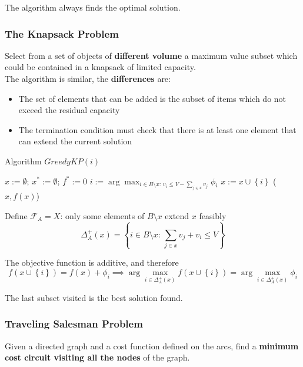 The algorithm always finds the optimal solution.\\

\newpage

\subsubsection{The Knapsack Problem} 
Select from a set of objects of \textbf{different volume} a maximum value subset which could be contained in a knapsack of limited capacity.\\

The algorithm is similar, the \textbf{differences} are:
\begin{itemize}
	\item The set of elements that can be added is the subset of items which do not exceed the residual capacity
	
	\item The termination condition must check that there is at least one element that can extend the current solution
\end{itemize}

\begin{algorithm}
	\caption{Algorithm $GreedyKP(i)$}
	\begin{algorithmic}
		\STATE $x := \emptyset$; $x^\ast := \emptyset$; $f^\ast := 0$
		\STATE $i := \arg \max_{i \in B \setminus x : \, v_i \leq V - \sum_{j \in x} v_j} \phi_i$
		\STATE $x := x \cup \left\{i\right\}$
		\ENDWHILE
		\RETURN ($x, f(x)$)
	\end{algorithmic}
\end{algorithm}

Define $\mathcal{F}_A = X$: only some elements of $B \setminus x$ extend $x$ feasibly
$$ \Delta_A^+ (x) = \left\{i \in B \setminus x: \, \sum_{j \in x} v_j + v_i \leq V \right\} $$

The objective function is additive, and therefore
$$ f\left(x \cup \left\{i\right\}\right) = f(x) + \phi_i \implies \arg \max_{i \in \Delta_A^+ (x)} f\left(x \cup \left\{i\right\}\right) = \arg \max_{i \in \Delta_A^+ (x)} \phi_i $$

The last subset visited is the best solution found.\\

\newpage

\subsubsection{Traveling Salesman Problem}
Given a directed graph and a cost function defined on the arcs, find a \textbf{minimum cost circuit visiting all the nodes} of the graph.\\

